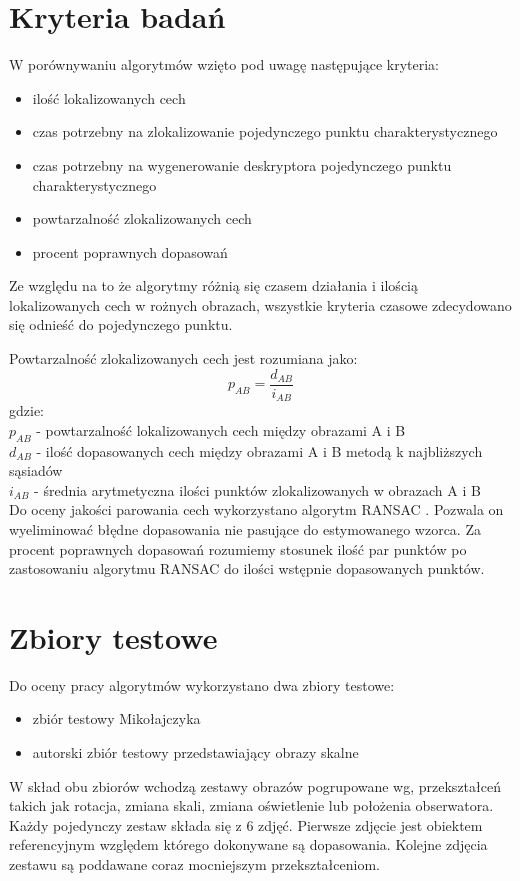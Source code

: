 \FloatBarrier
\section{Kryteria badań}
W porównywaniu algorytmów wzięto pod uwagę następujące kryteria:
\begin{itemize}
\item ilość lokalizowanych cech
\item czas potrzebny na zlokalizowanie pojedynczego punktu charakterystycznego
\item czas potrzebny na wygenerowanie deskryptora pojedynczego punktu charakterystycznego
\item powtarzalność zlokalizowanych cech
\item procent poprawnych dopasowań
\end{itemize}



Ze względu na to że algorytmy różnią się czasem działania i ilością lokalizowanych cech w rożnych obrazach, wszystkie kryteria czasowe zdecydowano się odnieść do pojedynczego punktu.


Powtarzalność zlokalizowanych cech jest rozumiana jako:
\begin{equation}
p_{AB}  = \frac{d_{AB}}{i_{AB}}
\end{equation}
gdzie:\\
$p_{AB}$ - powtarzalność lokalizowanych cech między obrazami A i B\\
$d_{AB}$ - ilość dopasowanych cech między obrazami A i B metodą k najbliższych sąsiadów\\
$i_{AB}$ - średnia arytmetyczna ilości punktów zlokalizowanych w obrazach A i B\\


Do oceny jakości parowania cech wykorzystano algorytm RANSAC \cite{ransac}. Pozwala on wyeliminować błędne dopasowania nie pasujące do estymowanego wzorca. Za procent poprawnych dopasowań rozumiemy stosunek ilość par punktów po zastosowaniu algorytmu RANSAC do ilości wstępnie dopasowanych punktów.
\FloatBarrier
\section{Zbiory testowe}
Do oceny pracy algorytmów wykorzystano dwa zbiory testowe:
\begin{itemize}
\item zbiór testowy Mikołajczyka
\item autorski zbiór testowy przedstawiający obrazy skalne
\end{itemize}
W skład obu zbiorów wchodzą zestawy obrazów pogrupowane wg, przekształceń takich jak rotacja, zmiana skali, zmiana oświetlenie lub położenia obserwatora. Każdy pojedynczy zestaw składa się z 6 zdjęć. Pierwsze zdjęcie jest obiektem referencyjnym względem którego dokonywane są dopasowania. Kolejne zdjęcia zestawu są poddawane coraz mocniejszym przekształceniom.

\FloatBarrier